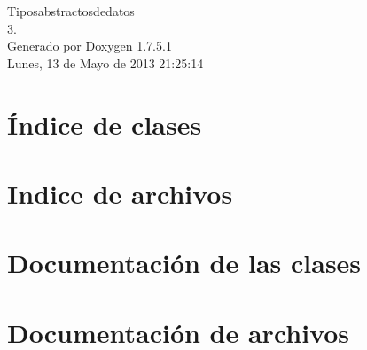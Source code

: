 \documentclass[a4paper]{book}
\begin{document}
\hypersetup{pageanchor=false,citecolor=blue}
\begin{titlepage}
\vspace*{7cm}
\begin{center}
{\Large \-Tiposabstractosdedatos \\[1ex]\large 3. }\\
\vspace*{1cm}
{\large \-Generado por Doxygen 1.7.5.1}\\
\vspace*{0.5cm}
{\small Lunes, 13 de Mayo de 2013 21:25:14}\\
\end{center}
\end{titlepage}
\clearemptydoublepage
{}
\tableofcontents
\clearemptydoublepage
{}
\hypersetup{pageanchor=true,citecolor=blue}
\chapter{Índice de clases}

\chapter{\-Indice de archivos}

\chapter{\-Documentación de las clases}













\chapter{\-Documentación de archivos}








\printindex
\end{document}
